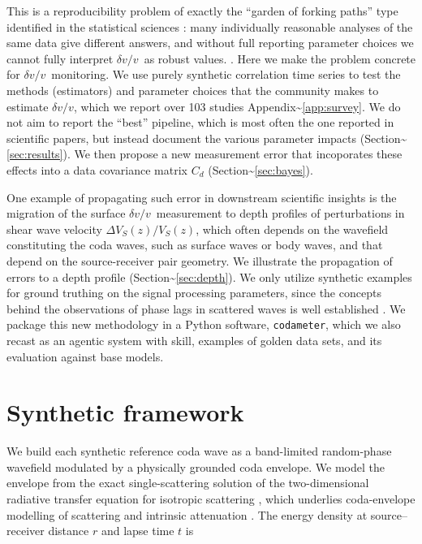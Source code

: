 \documentclass[
  referee]{gji}
\providecommand{\dvv}{\ensuremath{\delta v/v}}
\begin{document}
This is a reproducibility problem of exactly the ``garden of forking
paths'' type identified in the statistical sciences
\citep{Gelman2013, Steegen2016}: many individually reasonable analyses
of the same data give different answers, and without full reporting
parameter choices we cannot fully interpret \dvv~as robust values. .
Here we make the problem concrete for \dvv~monitoring. We use purely
synthetic correlation time series to test the methods (estimators) and
parameter choices that the community makes to estimate \dvv, which we
report over 103 studies Appendix\textasciitilde{}\ref{app:survey}. We do
not aim to report the ``best'' pipeline, which is most often the one
reported in scientific papers, but instead document the various
parameter impacts (Section\textasciitilde{}\ref{sec:results}). We then
propose a new measurement error that incoporates these effects into a
data covariance matrix \(C_d\)
(Section\textasciitilde{}\ref{sec:bayes}).

One example of propagating such error in downstream scientific insights
is the migration of the surface \dvv~measurement to depth profiles of
perturbations in shear wave velocity \(\Delta V_S(z)/V_S(z)\), which
often depends on the wavefield constituting the coda waves, such as
surface waves or body waves, and that depend on the source-receiver pair
geometry. We illustrate the propagation of errors to a depth profile
(Section\textasciitilde{}\ref{sec:depth}). We only utilize synthetic
examples for ground truthing on the signal processing parameters, since
the concepts behind the observations of phase lags in scattered waves is
well established \citep{Obermann2013}. We package this new methodology
in a Python software, \texttt{codameter}, which we also recast as an
agentic system with skill, examples of golden data sets, and its
evaluation against base models.

\section{Synthetic framework}\label{sec:methods}

We build each synthetic reference coda wave as a band-limited
random-phase wavefield modulated by a physically grounded coda envelope.
We model the envelope from the exact single-scattering solution of the
two-dimensional radiative transfer equation for isotropic scattering
\citep{Sato1993, Paasschens1997}, which underlies coda-envelope
modelling of scattering and intrinsic attenuation \citep{Margerin1998}.
The energy density at source--receiver distance \(r\) and lapse time
\(t\) is
\end{document}
